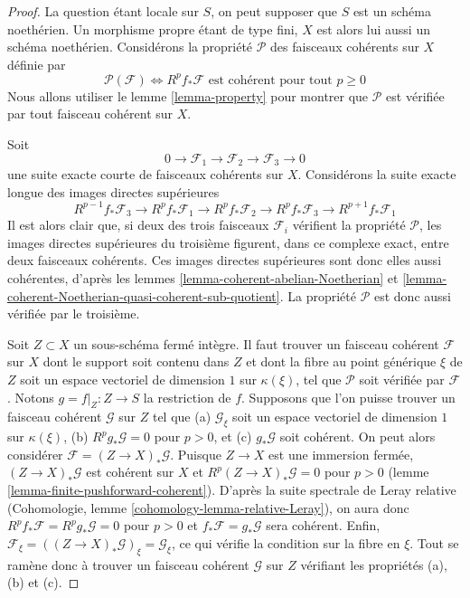 \begin{proof}
La question étant locale sur $S$, on peut supposer que $S$ est
un schéma noethérien. Un morphisme propre
étant de type fini, $X$ est alors lui aussi un schéma
noethérien. Considérons la propriété $\mathcal{P}$ des faisceaux cohérents
sur $X$ définie par
$$
\mathcal{P}(\mathcal{F}) \Leftrightarrow
R^pf_*\mathcal{F}\text{ est cohérent pour tout }p \geq 0
$$
Nous allons utiliser le
lemme \ref{lemma-property} pour montrer que
$\mathcal{P}$ est vérifiée par tout faisceau cohérent sur $X$.

\medskip\noindent
Soit
$$
0 \to \mathcal{F}_1 \to \mathcal{F}_2 \to \mathcal{F}_3 \to 0
$$
une suite exacte courte de faisceaux cohérents sur $X$.
Considérons la suite exacte longue des images directes supérieures
$$
R^{p - 1}f_*\mathcal{F}_3 \to
R^pf_*\mathcal{F}_1 \to
R^pf_*\mathcal{F}_2 \to
R^pf_*\mathcal{F}_3 \to
R^{p + 1}f_*\mathcal{F}_1
$$
Il est alors clair que, si deux des trois faisceaux $\mathcal{F}_i$
vérifient la propriété $\mathcal{P}$, les images directes supérieures du troisième figurent,
dans ce complexe exact, entre deux faisceaux cohérents. Ces
images directes supérieures sont donc elles aussi cohérentes, d'après les
lemmes \ref{lemma-coherent-abelian-Noetherian} et
\ref{lemma-coherent-Noetherian-quasi-coherent-sub-quotient}.
La propriété $\mathcal{P}$ est donc aussi vérifiée par le troisième.

\medskip\noindent
Soit $Z \subset X$ un sous-schéma fermé intègre.
Il faut trouver un faisceau cohérent $\mathcal{F}$ sur $X$ dont le support soit
contenu dans $Z$ et dont la fibre au point générique $\xi$ de $Z$ soit un espace vectoriel de dimension
$1$ sur $\kappa(\xi)$, tel que $\mathcal{P}$
soit vérifiée par $\mathcal{F}$. Notons $g = f|_Z : Z \to S$ la restriction de $f$.
Supposons que l'on puisse trouver un faisceau cohérent $\mathcal{G}$ sur $Z$ tel
que
(a) $\mathcal{G}_\xi$ soit un espace vectoriel de dimension $1$ sur $\kappa(\xi)$,
(b) $R^pg_*\mathcal{G} = 0$ pour $p > 0$, et
(c) $g_*\mathcal{G}$ soit cohérent. On peut alors considérer
$\mathcal{F} = (Z \to X)_*\mathcal{G}$. Puisque $Z \to X$ est une
immersion fermée, $(Z \to X)_*\mathcal{G}$ est cohérent sur $X$
et $R^p(Z \to X)_*\mathcal{G} = 0$ pour $p > 0$
(lemme \ref{lemma-finite-pushforward-coherent}).
D'après la suite spectrale de Leray relative
(Cohomologie, lemme \ref{cohomology-lemma-relative-Leray}),
on aura donc $R^pf_*\mathcal{F} = R^pg_*\mathcal{G} = 0$ pour $p > 0$
et $f_*\mathcal{F} = g_*\mathcal{G}$ sera cohérent.
Enfin, $\mathcal{F}_\xi = ((Z \to X)_*\mathcal{G})_\xi = \mathcal{G}_\xi$,
ce qui vérifie la condition sur la fibre en $\xi$.
Tout se ramène donc à trouver un faisceau cohérent $\mathcal{G}$
sur $Z$ vérifiant les propriétés (a), (b) et (c).


\end{proof}
